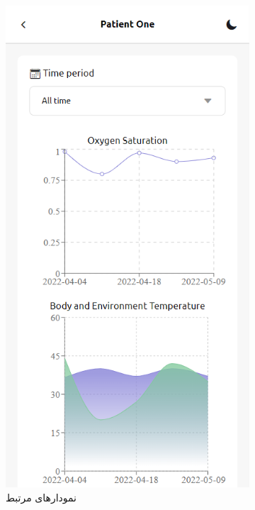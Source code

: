 \documentclass[12pt]{article}
\begin{document}
\begin{figure}
\begin{center}
\begin{subfigure}{.3\textwidth}
			\includegraphics[width=.9\linewidth]{app3_charts}
			\caption{نمودارهای مرتبط}
			\label{initial_charts}
		\end{subfigure}
		\begin{subfigure}{.3\textwidth}

\end{subfigure}
\end{center}
\end{figure}
\end{document}
